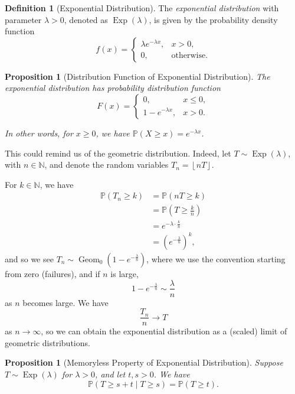 \documentclass[11pt]{article}
\numberwithin{equation}{section}
\newtheorem{proposition}[theorem]{Proposition}
\theoremstyle{definition}
\newtheorem{definition}[theorem]{Definition}
\theoremstyle{remark}
\newcommand{\pqty}[1]{\left(#1\right)}
\newcommand{\floor}[1]{\left\lfloor#1\right\rfloor}
\newcommand{\flatfrac}[2]{\frac{#1}{#2}}
\newcommand{\NN}{\mathbb N}
\newcommand{\Prob}{\mathbb P}
\newcommand{\Conditional}[2]{#1\mid #2}
\newcommand{\GeomZero}{\operatorname{Geom}_0}
\newcommand{\Exponential}{\operatorname{Exp}}
\begin{document}
\begin{definition}[Exponential Distribution]\label{probability-definition-046}
    \label{probability-def:exponential-distribution}%
    The \emph{exponential distribution} with parameter \(\lambda > 0\), denoted as \(\Exponential\pqty{\lambda}\), is given by the probability density function
    \[
        f\pqty{x} = \begin{cases}
            \lambda e^{-\lambda x}, & x > 0, \\
            0, & \text{otherwise}.
        \end{cases}
    \]
\end{definition}

\begin{proposition}[Distribution Function of Exponential Distribution]\label{probability-proposition-030}
    \label{probability-prop:cdf-exponential}%
    The exponential distribution has probability distribution function
    \[
        F\pqty{x} = \begin{cases}
            0, & x \leq 0, \\
            1-  e^{-\lambda x}, & x > 0.
        \end{cases}
    \]

    In other words, for \(x \geq 0\), we have \(\Prob\pqty{X \geq x} = e^{-\lambda x}\).
\end{proposition}

This could remind us of the geometric distribution. Indeed, let \(T \sim \Exponential \pqty{\lambda}\), with \(n \in \NN\), and denote the random variables \(T_n = \floor{nT}\).

For \(k \in \NN\), we have
\begin{align*}
    \Prob\pqty{T_n \geq k} &= \Prob\pqty{nT \geq k} \\
    &= \Prob\pqty{T \geq \frac{k}{n}} \\
    &= e^{- \lambda \cdot \frac{k}{n}} \\
    &= \pqty{e^{-{\frac{\lambda}{n}}}}^{k},
\end{align*}
and so we see \(T_n \sim \GeomZero\pqty{1 - e^{- \flatfrac{\lambda}{n}}}\), where we use the convention starting from zero (failures), and if \(n\) is large,
\[
    1-e^{- \frac{\lambda}{n}} \sim \frac{\lambda}{n}
\]
as \(n\) becomes large. We have
\[
    \frac{T_n}{n} \to T
\]
as \(n \to \infty\), so we can obtain the exponential distribution as a (scaled) limit of geometric distributions.

\begin{proposition}[Memoryless Property of Exponential Distribution]\label{probability-proposition-031}
    \label{probability-prop:memoryless-property-exponential}%
    Suppose \(T \sim \Exponential\pqty{\lambda}\) for \(\lambda > 0\), and let \(t, s > 0\). We have
    \[
        \Prob\pqty{\Conditional{T \geq s + t}{T \geq s}} = \Prob\pqty{T \geq t}.
    \]
\end{proposition}
\end{document}

